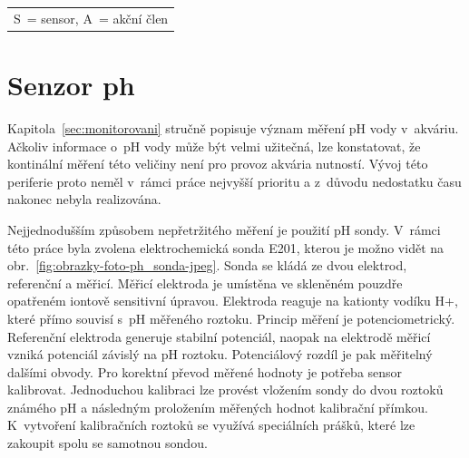 \begin{table}[h]
\begin{tabular}{|l|l|l|l|l|}
            \end{tabular}
            \begin{tabular}{c}
                S~= sensor, A~= akční člen \\
            \end{tabular}
   
    \end{table}










\section{Senzor \acs{ph}}
\label{sec:perif-sensor-ph}
Kapitola~\ref{sec:monitorovani} stručně popisuje význam měření pH vody v~akváriu. Ačkoliv informace o~pH vody může být velmi užitečná, lze konstatovat, že kontinální měření této veličiny není pro provoz akvária nutností. Vývoj této periferie proto neměl v~rámci práce nejvyšší prioritu a z~důvodu nedostatku času nakonec nebyla realizována.

Nejjednodušším způsobem nepřetržitého měření je použití pH sondy. V~rámci této práce byla zvolena elektrochemická sonda E201, kterou je možno vidět na obr.~\ref{fig:obrazky-foto-ph_sonda-jpeg}. Sonda se kládá ze dvou elektrod, referenční a měřicí. Měřicí elektroda je umístěna ve skleněném pouzdře opatřeném iontově sensitivní úpravou. Elektroda reaguje na kationty vodíku H+, které přímo souvisí s~pH měřeného roztoku. Princip měření je potenciometrický. Referenční elektroda generuje stabilní potenciál, naopak na elektrodě měřicí vzniká potenciál závislý na pH roztoku. Potenciálový rozdíl je pak měřitelný dalšími obvody. Pro korektní převod měřené hodnoty je potřeba sensor kalibrovat. Jednoduchou kalibraci lze provést vložením sondy do dvou roztoků známého pH a následným proložením měřených hodnot kalibrační přímkou. K~vytvoření kalibračních roztoků se využívá speciálních prášků, které lze zakoupit spolu se samotnou sondou.

